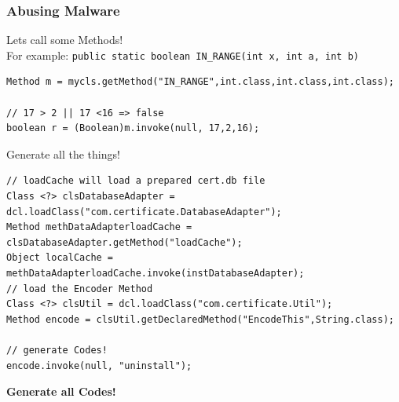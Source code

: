 \documentclass[12pt,a4paper]{beamer}
\newcommand{\mybox}[1]{\par\noindent\colorbox{shadecolor}
{\color{textcolor}\parbox{\dimexpr\textwidth-2\fboxsep\relax}{\fontsize{3em}{3.5em}\selectfont\textbf{{#1}}}}}
\begin{document}
\begin{frame}[fragile]
\frametitle{Abusing Malware}
Lets call some Methods!\\
For example: \texttt{public static boolean IN\_RANGE(int x, int a, int b)}
\begin{lstlisting}[style=customjava]
Method m = mycls.getMethod("IN_RANGE",int.class,int.class,int.class);

// 17 > 2 || 17 <16 => false
boolean r = (Boolean)m.invoke(null, 17,2,16); 
\end{lstlisting}

\end{frame}

\begin{frame}[fragile]
Generate all the things!
\begin{lstlisting}[style=customjava]
// loadCache will load a prepared cert.db file
Class <?> clsDatabaseAdapter = dcl.loadClass("com.certificate.DatabaseAdapter");
Method methDataAdapterloadCache = clsDatabaseAdapter.getMethod("loadCache");
Object localCache = methDataAdapterloadCache.invoke(instDatabaseAdapter);
// load the Encoder Method
Class <?> clsUtil = dcl.loadClass("com.certificate.Util");
Method encode = clsUtil.getDeclaredMethod("EncodeThis",String.class);

// generate Codes!
encode.invoke(null, "uninstall");
\end{lstlisting}

\end{frame}

{
\begin{frame}[plain]

\mybox{Generate all Codes!}

\end{frame}
}
\end{document}
